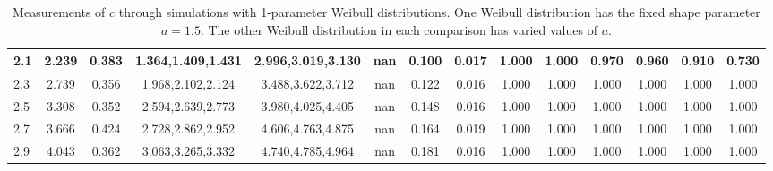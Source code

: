 \begin{table*}[h!]
\begin{center}
\begin{tabular}{| l | c | c | c | c | c | c | c | c | c | c | c | c | c |}
2.1 & 2.239 & 0.383 & 1.364,1.409,1.431 & 2.996,3.019,3.130  & nan  & 0.100  & 0.017  & 1.000  & 1.000  & 0.970  & 0.960  & 0.910  & 0.730 \\\hline
2.3 & 2.739 & 0.356 & 1.968,2.102,2.124 & 3.488,3.622,3.712  & nan  & 0.122  & 0.016  & 1.000  & 1.000  & 1.000  & 1.000  & 1.000  & 1.000 \\\hline
2.5 & 3.308 & 0.352 & 2.594,2.639,2.773 & 3.980,4.025,4.405  & nan  & 0.148  & 0.016  & 1.000  & 1.000  & 1.000  & 1.000  & 1.000  & 1.000 \\\hline
2.7 & 3.666 & 0.424 & 2.728,2.862,2.952 & 4.606,4.763,4.875  & nan  & 0.164  & 0.019  & 1.000  & 1.000  & 1.000  & 1.000  & 1.000  & 1.000 \\\hline
2.9 & 4.043 & 0.362 & 3.063,3.265,3.332 & 4.740,4.785,4.964  & nan  & 0.181  & 0.016  & 1.000  & 1.000  & 1.000  & 1.000  & 1.000  & 1.000 \\\hline
\end{tabular}
\caption{Measurements of $c$ through simulations
        with 1-parameter Weibull distributions.
        One Weibull distribution has the fixed shape parameter $a=1.5$.
        The other Weibull distribution in each comparison
        has varied values of $a$.}
\end{center}
\end{table*}